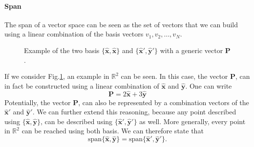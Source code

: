 \paragraph{Span}
The span of a vector space can be seen as the set of vectors that we can build using a linear combination of the basis vectors $v_1, v_2, \hdots, v_N$.
\begin{figure}[!h]
\centering
{}
\caption{Example of the two basis $\{\hat{\mathbf{x}}, \hat{\mathbf{x}}\}$ and $\{\hat{\mathbf{x}}', \hat{\mathbf{y}}'\}$ with a generic vector $\mathbf{P}$. \label{fig:span}}
\end{figure}
If we consider Fig.\ref{fig:span}, an example in $\mathbb{R}^2$ can be seen. In this case, the vector $\mathbf{P}$, can in fact be constructed using a linear combination of $\hat{\mathbf{x}}$ and $\hat{\mathbf{y}}$. One can write
\begin{equation*}
    \mathbf{P} = 2\hat{\mathbf{x}} + 3\hat{\mathbf{y}}
\end{equation*}
Potentially, the vector $\mathbf{P}$, can also be represented by a combination vectors of the $\hat{\mathbf{x}}'$ and $\hat{\mathbf{y}}'$. 
We can further extend this reasoning, because any point described using $\{\hat{\mathbf{x}},\hat{\mathbf{y}}\}$, can be described using $\{\hat{\mathbf{x}}',\hat{\mathbf{y}}'\}$ as well. 
More generally, every point in $\mathbb{R}^2$ can be reached using both basis. We can therefore state that 
\begin{equation*}
    \text{span}\{\hat{\mathbf{x}},\hat{\mathbf{y}}\} = \text{span}\{\hat{\mathbf{x}}',\hat{\mathbf{y}}'\}.
\end{equation*}
